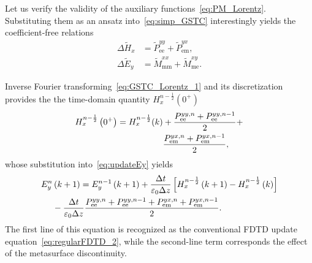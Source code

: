 \documentclass[journal]{IEEEtran}
\begin{document}
Let us verify the validity of the auxiliary functions~\eqref{eq:PM_Lorentz}. Substituting them as an ansatz into~\eqref{eq:simp_GSTC} interestingly yields the coefficient-free relations
\begin{subequations}\label{eq:GSTC_Lorentz}
  \begin{align}
  \Delta \tilde{H}_x &= \tilde{P}_\textrm{ee}^{yy}+\tilde{P}_\textrm{em}^{yx},\label{eq:GSTC_Lorentz_1} \\
  \Delta \tilde{E}_y &= \tilde{M}_\textrm{mm}^{xx}+\tilde{M}_\textrm{me}^{xy}.\label{eq:GSTC_Lorentz_2}
\end{align}
\end{subequations}

Inverse Fourier transforming~\eqref{eq:GSTC_Lorentz_1} and its discretization provides the the time-domain quantity $H_x^{n - \frac{1}{2}}(0^+)$
\begin{align}\label{eq:Hz0p_Lorentz}
  H_x^{n - \frac{1}{2}}\left(0^ +\right) = H_x^{n - \frac{1}{2}}(k) &+\frac{P_\textrm{ee}^{yy,n}+P_\textrm{ee}^{yy,n-1}}{2}+\\\notag &\frac{P_\textrm{em}^{yx,n}+P_\textrm{em}^{yx,n-1}}{2},
\end{align}
whose substitution into~\eqref{eq:updateEy} yields
\begin{align}\label{eq:Ey_update}
E_y^{n}&\left(k +1\right)=E_y^{n-1}\left( k+1\right)
+\frac{\Delta t}{\varepsilon_0\Delta z}\left[H_x^{n-\frac{1}{2}}\left(k+1\right)-H_x^{n-\frac{1}{2}}\left(k\right)\right]
\\\notag&-\frac{\Delta t}{\varepsilon_0\Delta z}\frac{P_\textrm{ee}^{yy,n}+P_\textrm{ee}^{yy,n-1}+P_\textrm{em}^{yx,n}+P_\textrm{em}^{yx,n-1}}{2}.
\end{align}
The first line of this equation is recognized as the conventional FDTD update equation~\eqref{eq:regularFDTD_2}, while the second-line term corresponds the effect of the metasurface discontinuity.
\end{document}
